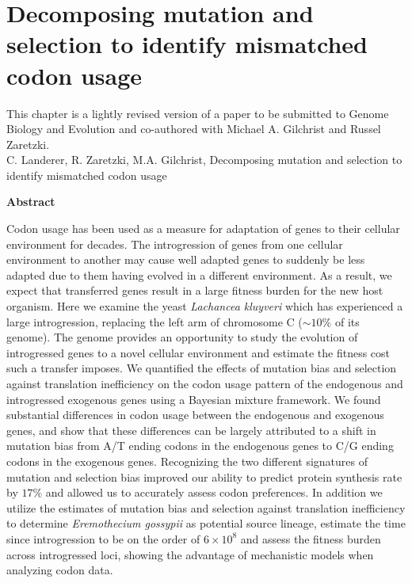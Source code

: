 \chapter{Decomposing mutation and selection to identify mismatched codon usage}
\label{ch:kluyveri}


This chapter is a lightly revised version of a paper to be submitted to Genome Biology and Evolution and co-authored with Michael A. Gilchrist and Russel Zaretzki.\\
\newline
\newline
C. Landerer, R. Zaretzki, M.A. Gilchrist, Decomposing mutation and selection to identify mismatched codon usage

\clearpage
\pagebreak

\begin{center}\textbf{Abstract}\end{center}
Codon usage has been used as a measure for adaptation of genes to their cellular environment for decades. 
The introgression of genes from one cellular environment to another may cause well adapted genes to suddenly be less adapted due to them having evolved in a different environment.
As a result, we expect that transferred genes result in a large fitness burden for the new host organism.
Here we examine the yeast \textit{Lachancea kluyveri} which has experienced a large introgression, replacing the left arm of chromosome C ($\sim 10 \%$ of its genome).
The \kluyveri genome provides an opportunity to study the evolution of introgressed genes to a novel cellular environment and estimate the fitness cost such a transfer imposes.
We quantified the effects of mutation bias and selection against translation inefficiency on the codon usage pattern of the endogenous and introgressed exogenous genes using a Bayesian mixture framework.
We found substantial differences in codon usage between the endogenous and exogenous genes, and show that these differences can be largely attributed to a shift in mutation bias from A/T ending codons in the endogenous genes to C/G ending codons in the exogenous genes.
Recognizing the two different signatures of mutation and selection bias improved our ability to predict protein synthesis rate by $17 \%$ and allowed us to accurately assess codon preferences.
In addition we utilize the estimates of mutation bias and selection against translation inefficiency to determine \textit{Eremothecium gossypii} as potential source lineage, estimate the time since introgression to be on the order of $6\times 10^8$ and assess the fitness burden across introgressed loci, showing the advantage of mechanistic models when analyzing codon data.


